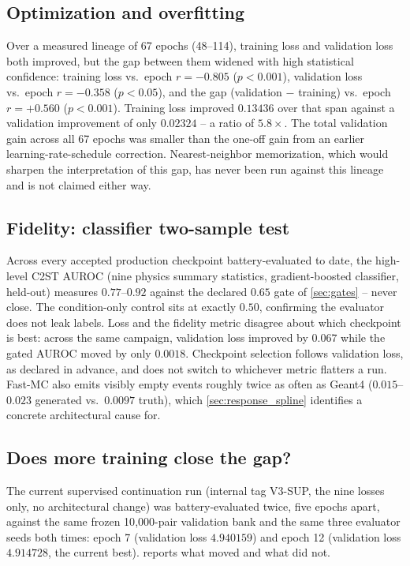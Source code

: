 \documentclass[10pt,a4paper]{article}
\begin{document}
\subsection{Optimization and overfitting}
Over a measured lineage of 67 epochs (48--114), training loss and validation loss both improved, but the gap between them widened with high statistical confidence: training loss vs.\ epoch $r=-0.805$ ($p<0.001$), validation loss vs.\ epoch $r=-0.358$ ($p<0.05$), and the gap (validation $-$ training) vs.\ epoch $r=+0.560$ ($p<0.001$). Training loss improved $0.13436$ over that span against a validation improvement of only $0.02324$ -- a ratio of $5.8\times$. The total validation gain across all 67 epochs was smaller than the one-off gain from an earlier learning-rate-schedule correction. Nearest-neighbor memorization, which would sharpen the interpretation of this gap, has never been run against this lineage and is not claimed either way.

\subsection{Fidelity: classifier two-sample test}
\label{sec:c2st_results}
Across every accepted production checkpoint battery-evaluated to date, the high-level C2ST AUROC (nine physics summary statistics, gradient-boosted classifier, held-out) measures $0.77$--$0.92$ against the declared $0.65$ gate of \cref{sec:gates} -- never close. The condition-only control sits at exactly $0.50$, confirming the evaluator does not leak labels. Loss and the fidelity metric disagree about which checkpoint is best: across the same campaign, validation loss improved by $0.067$ while the gated AUROC moved by only $0.0018$. Checkpoint selection follows validation loss, as declared in advance, and does not switch to whichever metric flatters a run. Fast-MC also emits visibly empty events roughly twice as often as Geant4 ($0.015$--$0.023$ generated vs.\ $0.0097$ truth), which \cref{sec:response_spline} identifies a concrete architectural cause for.

\subsection{Does more training close the gap?}
\label{sec:epoch_trend}
The current supervised continuation run (internal tag V3-SUP, the nine losses only, no architectural change) was battery-evaluated twice, five epochs apart, against the same frozen 10{,}000-pair validation bank and the same three evaluator seeds both times: epoch 7 (validation loss $4.940159$) and epoch 12 (validation loss $4.914728$, the current best).  reports what moved and what did not.
\end{document}
